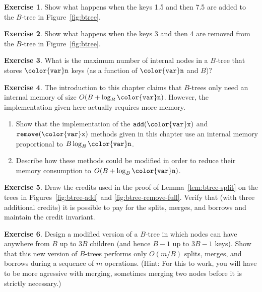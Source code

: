 \documentclass[10pt]{book}
\newcommand{\figref}[1]{Figure~\ref{fig:#1}}
\theoremstyle{plain}
\newcommand{\lemref}[1]{Lemma~\ref{lem:#1}}
\theoremstyle{definition}
\newtheorem{exc}{Exercise}[chapter]
\begin{document}
\begin{exc}
  Show what happens when the keys 1.5 and then 7.5 are added to the
  $B$-tree in \figref{btree}.
\end{exc}

\begin{exc}
  Show what happens when the keys 3 and then 4 are removed from the
  $B$-tree in \figref{btree}.
\end{exc}

\begin{exc}
  What is the maximum number of internal nodes in a $B$-tree that stores
  \ensuremath{\mathtt{{\color{var}n}}} keys (as a function of \ensuremath{\mathtt{{\color{var}n}}} and $B$)?
\end{exc}

\begin{exc}
  The introduction to this chapter claims that $B$-trees only need an
  internal memory of size $O(B+\log_B\ensuremath{\mathtt{{\color{var}n}}})$.  However, the implementation
  given here actually requires more memory.
  \begin{enumerate}
    \item Show that the implementation of the \ensuremath{\mathtt{add({\color{var}x})}} and \ensuremath{\mathtt{remove({\color{var}x})}}
      methods given in this chapter use an internal memory
      proportional to $B\log_B \ensuremath{\mathtt{{\color{var}n}}}$.
    \item Describe how these methods could be modified in order to reduce their memory
      consumption to $O(B + \log_B \ensuremath{\mathtt{{\color{var}n}}})$.
  \end{enumerate}
\end{exc}

\begin{exc}
  Draw the credits used in the proof of \lemref{btree-split} on the trees
  in Figures~\ref{fig:btree-add} and \ref{fig:btree-remove-full}.  Verify
  that (with three additional credits) it is possible to pay for the splits, 
  merges, and borrows and maintain the credit invariant.
\end{exc}

\begin{exc}
  Design a modified version of a $B$-tree in which nodes can have anywhere
  from $B$ up to $3B$ children (and hence $B-1$ up to $3B-1$ keys).
  Show that this new version of $B$-trees performs only $O(m/B)$ splits,
  merges, and borrows during a sequence of $m$ operations.  (Hint:
  For this to work, you will have to be more agressive with merging,
  sometimes merging two nodes before it is strictly necessary.)
\end{exc}
\end{document}
